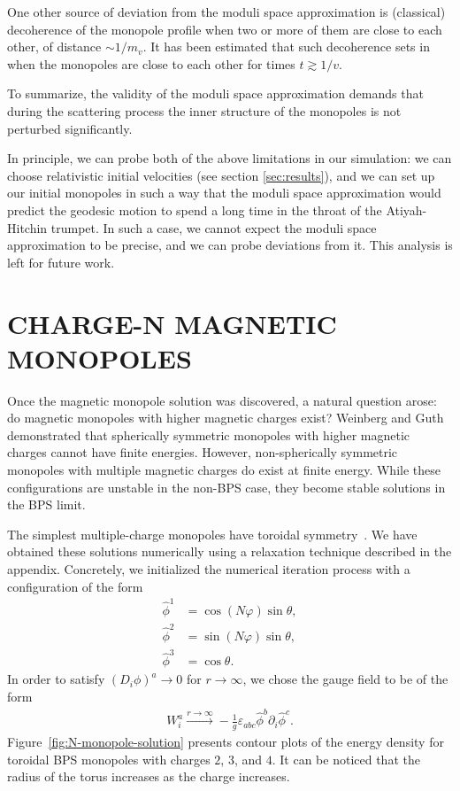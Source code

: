 \documentclass[aps, prd, twocolumn, superscriptaddress, preprintnumbers, nofootinbib, longbibliography]{revtex4-1}
\begin{document}
One other source of deviation from the moduli space approximation is (classical) decoherence of the monopole profile when two or more of them are close to each other, of distance $\sim 1/m_v$. It has been estimated \cite{Stuart:1994tc} that such decoherence sets in when the monopoles are close to each other for times $t \gtrsim 1/v$. 

To summarize, the validity of the moduli space approximation demands that during the scattering process the inner structure 
of the monopoles is not perturbed significantly.

In principle, we can probe both of the above limitations in our simulation: we can choose relativistic initial velocities (see section \ref{sec:results}), and we can set up our initial monopoles in such a way that the moduli space approximation would predict the geodesic motion to spend a long time in the throat of the Atiyah-Hitchin trumpet. In such a case, we cannot expect the moduli space approximation to be precise, and we can probe deviations from it.
 This analysis is left for future work.


\section{\MakeUppercase{Charge-N Magnetic Monopoles}}
\label{sec:charge-n-magnetic-monopoles}
Once the magnetic monopole solution was discovered, a natural question arose: do magnetic monopoles with higher magnetic charges exist? Weinberg and Guth~\cite{Weinberg:1976eq} demonstrated that spherically symmetric monopoles with higher magnetic charges cannot have finite energies. However, non-spherically symmetric monopoles with multiple magnetic charges do exist at finite energy.
 While these configurations are unstable in the non-BPS case, they become stable solutions in the BPS limit.

The simplest multiple-charge monopoles have toroidal symmetry~\cite{Ward:1981jb, FORGACS1981141, Prasad:1980hi}. We have obtained these solutions numerically using a relaxation technique described in the appendix. Concretely, we initialized the numerical iteration process with a configuration of the form
\begin{align}
    \hat{\phi}^1&=\cos{(N \varphi)}\sin{\theta},\nonumber\\
    \hat{\phi}^2&=\sin{(N \varphi)}\sin{\theta},\nonumber\\
    \hat{\phi}^3&=\cos{\theta}.
\end{align}
In order to satisfy $(D_i\phi)^a\rightarrow 0$ for $r\rightarrow \infty$, we chose the gauge field to be of the form
\begin{align}
    W^a_i\xrightarrow{r\rightarrow \infty} -\frac{1}{g}\varepsilon_{abc} \hat{\phi}^b \partial_i \hat{\phi}^c.
\end{align}
Figure~\ref{fig:N-monopole-solution} presents contour plots of the energy density for toroidal BPS monopoles with charges $2$, $3$, and $4$. It can be noticed that the radius of the torus increases as the charge increases.
\end{document}
